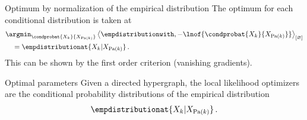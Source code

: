 \documentclass{beamer}
\begin{document}
    \begin{frame}{Optimum by normalization of the empirical distribution}
        The optimum for each conditional distribution is taken at
        \begin{align*}
            &\argmin_{\condprobat{\catvariableof{\catenumerator}}{\catvariableof{\parentsof{\catenumerator}}}}
            \contraction{\empdistributionwith,-\lnof{\condprobat{\catvariableof{\catenumerator}}{\catvariableof{\parentsof{\catenumerator}}}}} \\
            &\quad=\empdistributionat{\catvariableof{\catenumerator}|\catvariableof{\parentsof{\catenumerator}}} \, .
        \end{align*}
        This can be shown by the first order criterion (vanishing gradients).

        \begin{block}{Optimal parameters}
            Given a directed hypergraph, the local likelihood optimizers are the conditional probability distributions of the empirical distribution
            \begin{align*}
                \empdistributionat{\catvariableof{\catenumerator}|\catvariableof{\parentsof{\catenumerator}}} \, .
            \end{align*}
        \end{block}
    \end{frame}


%
%
%
\end{document}
